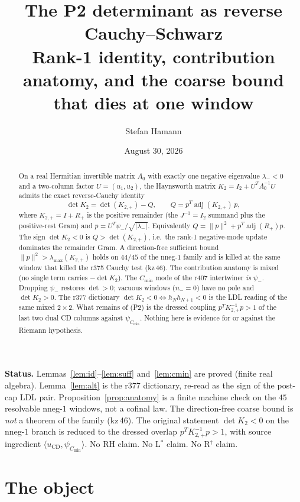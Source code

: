 \documentclass[11pt]{article}
\title{\bfseries The P2 determinant as reverse Cauchy--Schwarz\\[2mm]
\large Rank-1 identity, contribution anatomy, and the coarse
bound that dies at one window}
\author{Stefan Hamann}
\date{August 30, 2026}
\theoremstyle{remark}
\newcommand{\lam}{\lambda_{-}}
\newcommand{\psim}{\psi_{-}}
\newcommand{\Rp}{R_{+}}
\newcommand{\Kp}{K_{2,+}}
\begin{document}
\maketitle

\begin{abstract}\noindent
On a real Hermitian invertible matrix $A_{0}$ with exactly one
negative eigenvalue $\lam<0$ and a two-column factor $U=(u_{1},u_{2})$,
the Haynsworth matrix $K_{2}=I_{2}+U^{T}A_{0}^{-1}U$ admits the
exact reverse-Cauchy identity
\[
\det K_{2}
=\det(\Kp)-Q,
\qquad
Q=p^{T}\operatorname{adj}(\Kp)\,p,
\]
where $\Kp=I+\Rp$ is the positive remainder (the $J^{-1}=I_{2}$
summand plus the positive-rest Gram) and
$p=U^{T}\psim/\sqrt{|\lam|}$.  Equivalently
$Q=\|p\|^{2}+p^{T}\operatorname{adj}(\Rp)p$.
The sign $\det K_{2}<0$ is $Q>\det(\Kp)$, i.e.\ the rank-1
negative-mode update dominates the remainder Gram.
A direction-free sufficient bound $\|p\|^{2}>\lambda_{\max}(\Kp)$
holds on $44/45$ of the nneg-$1$ family and is killed at the
same window that killed the r375 Cauchy test (kz\,46).
The contribution anatomy is mixed (no single term carries
$-\det K_{2}$).  The $C_{\min}$ mode of the r407 intertwiner
\emph{is} $\psim$.  Dropping $\psim$ restores $\det>0$;
vacuous windows ($n_{-}=0$) have no pole and $\det K_{2}>0$.
The r377 dictionary $\det K_{2}<0\iff h_{N}h_{N+1}<0$ is the
LDL reading of the same mixed $2\times2$.
What remains of (P2) is the dressed coupling
$p^{T}\Kp^{-1}p>1$ of the last two dual CD columns against
$\psi_{C_{\min}}$.  Nothing here is evidence for or against
the Riemann hypothesis.
\end{abstract}

\medskip\noindent
\textbf{Status.}\enspace
Lemmas~\ref{lem:id}--\ref{lem:suff} and~\ref{lem:cmin} are
proved (finite real algebra).
Lemma~\ref{lem:alt} is the r377 dictionary, re-read as the
sign of the post-cap LDL pair.
Proposition~\ref{prop:anatomy} is a finite machine check on the
$45$ resolvable nneg-$1$ windows, not a cofinal law.
The direction-free coarse bound is \emph{not} a theorem of the
family (kz\,46).
The original statement $\det K_{2}<0$ on the nneg-$1$ branch
is reduced to the dressed overlap $p^{T}\Kp^{-1}p>1$, with
source ingredient $\langle u_{\mathrm{CD}},\psi_{C_{\min}}\rangle$.
No RH claim.  No L$^{*}$ claim.  No R$^{\dagger}$ claim.

\section{The object}\label{sec:obj}
\end{document}
